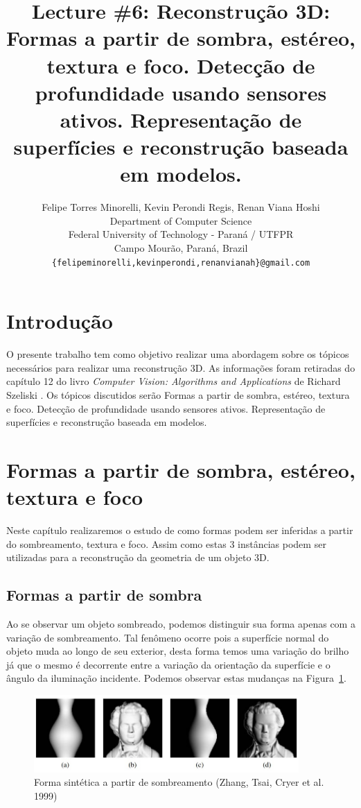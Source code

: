 \documentclass{article}
\title{Lecture \#6: Reconstrução 3D: Formas a partir de sombra, estéreo, textura e foco. Detecção de profundidade usando sensores ativos. Representação de superfícies e reconstrução baseada em modelos.}
\author{
  Felipe Torres Minorelli, Kevin Perondi Regis, Renan Viana Hoshi \\
  Department of Computer Science\\
  Federal University of Technology - Paran\'{a} / UTFPR\\
  Campo Mour\~{a}o, Paran\'{a}, Brazil \\
  \texttt{\{felipeminorelli,kevinperondi,renanvianah\}@gmail.com} \\
}
\begin{document}
\maketitle


\section{Introdução}

O presente trabalho tem como objetivo realizar uma abordagem sobre os tópicos necessários para realizar uma reconstrução 3D. As informações foram retiradas do capítulo 12 do livro \textit{Computer Vision: Algorithms and Applications} de  Richard Szeliski \cite{Szeliski:2010}. Os tópicos discutidos serão Formas a partir de sombra, estéreo, textura e foco. Detecção de profundidade usando sensores ativos. Representação de superfícies e reconstrução baseada em modelos.

\section{Formas a partir de sombra, estéreo, textura e foco}

Neste capítulo realizaremos o estudo de como formas podem ser inferidas a partir do sombreamento, textura e foco. Assim como estas 3 instâncias podem ser utilizadas para a reconstrução da geometria de um objeto 3D.

\subsection{Formas a partir de sombra}

Ao se observar um objeto sombreado, podemos distinguir sua forma apenas com a variação de sombreamento. Tal fenômeno ocorre pois a superfície normal do objeto muda ao longo de seu exterior, desta forma temos uma variação do brilho já que o mesmo é decorrente entre a variação da orientação da superfície e o ângulo da iluminação incidente. Podemos observar estas mudanças na Figura~\ref{fig:sombra}.

\begin{figure}[!htb]
    \centering
    \includegraphics[width=0.90\textwidth]{imagem1.jpg}
    \caption{Forma sintética a partir de sombreamento (Zhang, Tsai, Cryer et al. 1999)}
    \label{fig:sombra}
\end{figure}
\end{document}
